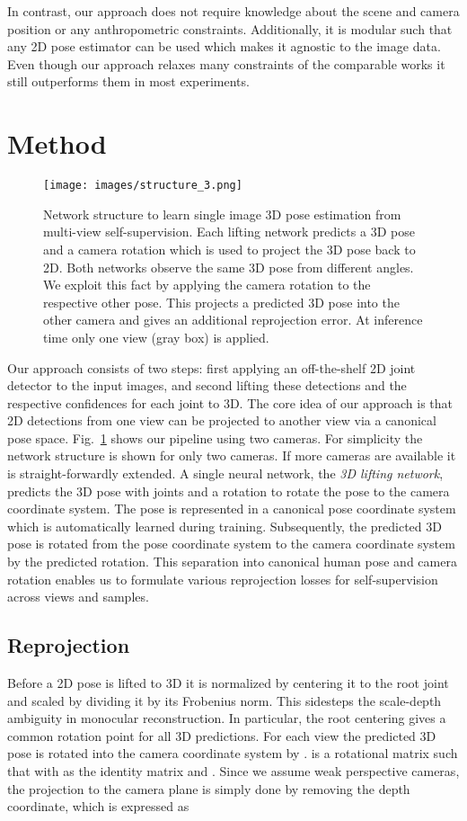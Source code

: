 \documentclass[final]{cvpr}
\begin{document}
In contrast, our approach does not require knowledge about the scene and camera position or any anthropometric constraints.
Additionally, it is modular such that any 2D pose estimator can be used which makes it agnostic to the image data.
Even though our approach relaxes many constraints of the comparable works it still outperforms them in most experiments.

\section{Method}
\begin{figure}
	\centering
	\texttt{[image: images/structure\_3.png]}
	\caption{Network structure to learn single image 3D pose estimation from multi-view self-supervision. Each lifting network predicts a 3D pose and a camera rotation which is used to project the 3D pose back to 2D. Both networks observe the same 3D pose from different angles. We exploit this fact by applying the camera rotation to the respective other pose. This projects a predicted 3D pose into the other camera and gives an additional reprojection error. At inference time only one view (gray box) is applied.}
	\label{fig:structure}
\end{figure}
Our approach consists of two steps: first applying an off-the-shelf 2D joint detector to the input images, and second lifting these detections and the respective confidences for each joint to 3D.
The core idea of our approach is that 2D detections from one view can be projected to another view via a canonical pose space.
Fig.~\ref{fig:structure} shows our pipeline using two cameras.
For simplicity the network structure is shown for only two cameras.
If more cameras are available it is straight-forwardly extended.
A single neural network, the \textit{3D lifting network}, predicts the 3D pose  with  joints and a rotation  to rotate the pose to the camera coordinate system.
The pose is represented in a canonical pose coordinate system which is automatically learned during training.
Subsequently, the predicted 3D pose is rotated from the pose coordinate system to the camera coordinate system by the predicted rotation.
This separation into canonical human pose and camera rotation enables us to formulate various reprojection losses for self-supervision across views and samples.

\subsection{Reprojection}
\label{sec:reprojection}
Before a 2D pose is lifted to 3D it is normalized by centering it to the root joint and scaled by dividing it by its Frobenius norm.
This sidesteps the scale-depth ambiguity in monocular reconstruction.
In particular, the root centering gives a common rotation point for all 3D predictions.
For each view the predicted 3D pose is rotated into the camera coordinate system by .
 is a rotational matrix such that  with  as the  identity matrix and .
Since we assume weak perspective cameras, the projection to the camera plane is simply done by removing the depth coordinate, which is expressed as 
\end{document}

